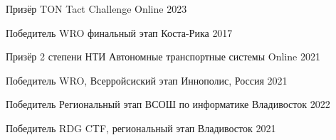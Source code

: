 

\begin{cvhonors}

  \cvhonor
    {Призёр} %
    {TON Tact Challenge} %
    {Online} %
    {2023} %
    
    \cvhonor
    {Победитель} %
    {WRO финальный этап} %
    {Коста-Рика} %
    {2017} %

  \cvhonor
    {Призёр 2 степени} %
    {НТИ Автономные транспортные системы} %
    {Online} %
    {2021} %

  \cvhonor
    {Победитель} %
    {WRO, Всерройсиский этап} %
    {Иннополис, Россия} %
    {2021} %

  \cvhonor
    {Победитель} %
    {Региональный этап ВСОШ по информатике} %
    {Владивосток} %
    {2022} %

  \cvhonor
    {Победитель} %
    {RDG CTF, региональный этап} %
    {Владивосток} %
    {2021} %

\end{cvhonors}
